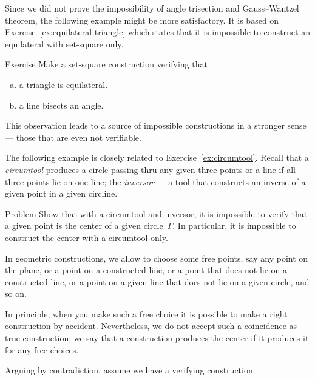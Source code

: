 Since we did not prove the impossibility of angle trisection and Gauss--Wantzel theorem, the following example might be more satisfactory.
It is based on Exercise~\ref{ex:equilateral triangle} which states that it is impossible to construct an equilateral with set-square only.

\begin{thm}{Exercise}\label{ex:equilateral triangle-verify}
Make a set-square construction verifying that 
\begin{enumerate}[(a)]
\item\label{ex:verify:triangle} a triangle is equilateral.
\item\label{ex:verify:bisector} a line bisects an angle.
\end{enumerate}
\end{thm}

This observation leads to a source of impossible constructions in a stronger sense --- those that are even not verifiable.

The following example is closely related to Exercise~\ref{ex:circumtool}.
Recall that a \emph{circumtool} produces a circle passing thru any given three points
or a line if all three points lie on one line;
the \emph{inversor} --- a tool that constructs an inverse of a given point in a given circline.


\begin{thm}{Problem}\label{prob:center-inversor+circumtool}
Show that with a circumtool and inversor,
it is impossible to verify that a given point is the center of a given circle~$\Gamma$.
In particular, it is impossible to construct the center with a circumtool only.
\end{thm}

In geometric constructions, we allow to choose some free points,
say any point on the plane, or a point on a constructed line, or a point that does not lie on a constructed line, 
or a point on a given line that does not lie on a given circle, and so on.

In principle, when you make such a free choice it is possible to make a right construction by accident.
Nevertheless, we do not accept such a coincidence as true construction; 
we say that a construction produces the center if it produces it for any free choices.


\label{page:solution-for-ex:circumtool}
Arguing by contradiction, 
assume we have a verifying construction. 

